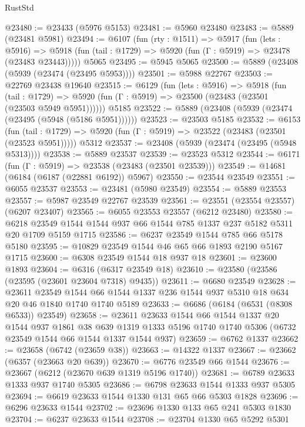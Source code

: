 \begin{lexlean}{RustStd}
\begin{coremodule}
@23480 := @23433 (@5976 @5153)
@23481 := @5960 @23480
@23483 := @5889 (@23481 @5981)
@23494 := @6107
    (fun (rty : @1511) =>
    @5917
      (fun (lets : @5916) =>
      @5918 (fun (tail : @1729) => @5920 (fun (Γ : @5919) => @23478 (@23483 @23443)))))
    @5065
@23495 := @5945 @5065
@23500 := @5889 (@23408 (@5939 (@23474 (@23495 @5953))))
@23501 := @5988 @22767
@23503 := @22769 @23438 @19640
@23515 := @6129
    (fun (lets : @5916) =>
    @5918
      (fun (tail : @1729) =>
      @5920 (fun (Γ : @5919) => @23500 (@23483 (@23501 (@23503 @5949 @5951))))))
    @5185
@23522 := @5889 (@23408 (@5939 (@23474 (@23495 (@5948 (@5186 @5951))))))
@23523 := @23503 @5185
@23532 := @6153
    (fun (tail : @1729) => @5920 (fun (Γ : @5919) => @23522 (@23483 (@23501 (@23523 @5951)))))
    @5312
@23537 := @23408 (@5939 (@23474 (@23495 (@5948 @5313))))
@23538 := @5889 @23537
@23539 := @23523 @5312
@23544 := @6171 (fun (Γ : @5919) => @23538 (@23483 (@23501 @23539)))
@23549 := @14681 (@6184 (@6187 (@22881 @6192)) @5967)
@23550 := @23544 @23549
@23551 := @6055 @23537
@23553 := @23481 (@5980 @23549)
@23554 := @5889 @23553
@23557 := @5987 @23549 @22767 @23539
@23561 := @23551 (@23554 @23557) (@6207 @23407)
@23565 := @6055 @23553 @23557 (@6212 @23480)
@23580 := @6218 @23549 @1544 @1544 @937 @66 @1544 @785 @1337 @237 @5182 @5311 @20 @1709 @5159 @1715
@23586 := @6237 @23549 @1544 @785 @66 @5178 @5180
@23595 := @10829 @23549 @1544 @46 @65 @66 @1893 @2190 @5167 @1715
@23600 := @6308 @23549 @1544 @18 @937 @18
@23601 := @23600 @1893
@23604 := @6316 (@6317 @23549 @18)
@23610 := @23580 (@23586 (@23595 (@23601 @23604 @7318) @9435))
@23611 := @6680 @23549
@23628 := @23611
    @23549
    @1544
    @66
    @1544
    @1337
    @236
    @1544
    @937
    @5310
    @18
    @634
    @20
    @46
    @1840
    @1740
    @1740
    @5189
@23633 := @6686 (@6184 (@6531 (@8308 @6533)) @23549)
@23658 := @23611
    @23633
    @1544
    @66
    @1544
    @1337
    @20
    @1544
    @937
    @1861
    @38
    @639
    @1319
    @1333
    @5196
    @1740
    @1740
    @5306
    (@6732 @23549 @1544 @66 @1544 @1337 @1544 @937)
@23659 := @6762 @1337
@23662 := @23658 (@6742 (@23659 @38))
@23663 := @14322 @1337
@23667 := @23662 (@6357 (@23663 @20 @639))
@23670 := @6776 @23549 @66 @1544
@23676 := @23667 (@6212 (@23670 @639 @1319 @5196 @1740))
@23681 := @6789 @23633 @1333 @937 @1740 @5305
@23686 := @6798 @23633 @1544 @1333 @937 @5305
@23694 := @6619 @23633 @1544 @1330 @131 @65 @66 @5303 @1828
@23696 := @6296 @23633 @1544
@23702 := @23696 @1330 @133 @65 @241 @5303 @1830
@23704 := @6237 @23633 @1544
@23708 := @23704 @1330 @65 @5292 @5301

\end{coremodule}
\end{lexlean}
